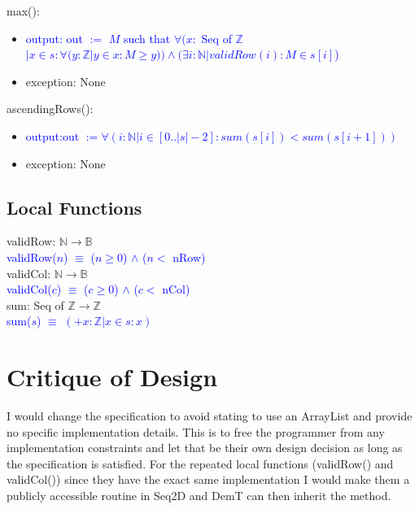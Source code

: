 \documentclass[12pt]{article}
\begin{document}
\noindent max():
\begin{itemize}
\item \textcolor{blue}{output: out $:=$ $M$ such that $\forall (x : $ Seq of $\mathbb{Z}$ $| x \in s : \forall (y : \mathbb{Z} | y \in x : M \geq y ))  \land (\exists i : \mathbb{N} | validRow(i) : M \in s[i] $)}
\item exception: None
\end{itemize}

\noindent ascendingRows():
\begin{itemize}
\item \textcolor{blue}{output:out $:= \forall (i : \mathbb{N} | i \in [0..|s|-2] : sum(s[i]) < sum(s[i+1])) $}
\item exception: None
\end{itemize}

\subsection*{Local Functions}

\noindent validRow: $\mathbb{N} \rightarrow \mathbb{B}$\\
\noindent \textcolor{blue}{validRow($n$) $\equiv$ ($n \geq 0$) $\land$ ($n < $ nRow)}\\

\noindent validCol: $\mathbb{N} \rightarrow \mathbb{B}$\\
\noindent \textcolor{blue}{validCol($c$) $\equiv$ ($c \geq 0$) $\land$ ($c < $ nCol)}\\
  
\noindent sum: Seq of $\mathbb{Z} \rightarrow \mathbb{Z}$\\
\noindent \textcolor{blue}{sum($s$) $\equiv$ $(+x : \mathbb{Z} | x \in s: x)$}



\newpage

\section*{Critique of Design}


I would change the specification to avoid stating to use an ArrayList and provide no specific implementation details. This is to free the programmer from any implementation constraints and let that be their own design decision as long as the specification is satisfied. For the repeated local functions (validRow() and validCol()) since they have the exact same implementation I would make them a publicly accessible routine in Seq2D and DemT can then inherit the method. \\
\end{document}
